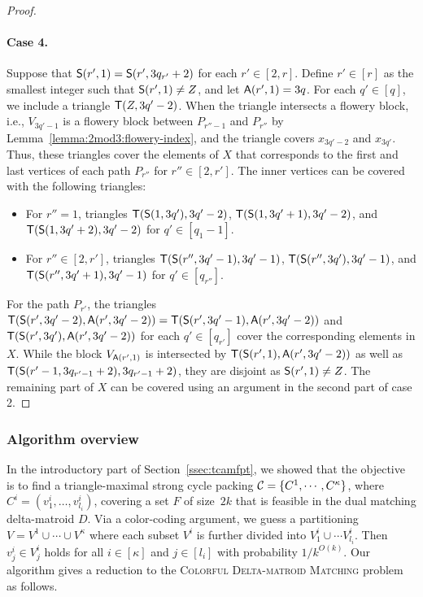 \begin{proof}
  \paragraph{Case 4.}
  Suppose that $\mathsf{S}(r', 1) = \mathsf{S}(r', 3q_{r'} + 2)$ for each $r' \in [2, r]$.
  Define $r' \in [r]$ as the smallest integer such that $\mathsf{S}(r', 1) \ne Z$, and let $\mathsf{A}(r', 1) = 3q$.
  For each $q' \in [q]$, we include a triangle $\mathsf{T}(Z, 3q'-2)$.
  When the triangle intersects a flowery block, i.e., $V_{3q'-1}$ is a flowery block between $P_{r''-1}$ and $P_{r''}$ by Lemma~\ref{lemma:2mod3:flowery-index}, and the triangle covers $x_{3q'-2}$ and $x_{3q'}$. 
  Thus, these triangles cover the elements of $X$ that corresponds to the first and last vertices of each path $P_{r''}$ for $r'' \in [2, r']$.
  The inner vertices can be covered with the following triangles:
  \begin{itemize}
    \item 
    For $r'' = 1$, triangles $\mathsf{T}(\mathsf{S}(1, 3q'), 3q'-2)$, $\mathsf{T}(\mathsf{S}(1, 3q'+1), 3q'-2)$, and $\mathsf{T}(\mathsf{S}(1, 3q'+2), 3q'-2)$ for $q' \in [q_{1}-1]$.
    \item
    For $r'' \in [2, r']$, triangles $\mathsf{T}(\mathsf{S}(r'', 3q'-1), 3q'-1)$, $\mathsf{T}(\mathsf{S}(r'', 3q'), 3q'-1)$, and $\mathsf{T}(\mathsf{S}(r'', 3q'+1), 3q'-1)$ for $q' \in [q_{r''}]$.
  \end{itemize}
  For the path $P_{r'}$, the triangles $\mathsf{T}(\mathsf{S}(r', 3q'-2), \mathsf{A}(r', 3q'-2)) = \mathsf{T}(\mathsf{S}(r', 3q'-1), \mathsf{A}(r', 3q'-2))$ and $\mathsf{T}(\mathsf{S}(r', 3q'), \mathsf{A}(r', 3q'-2))$ for each $q' \in [q_{r'}]$ cover the corresponding elements in $X$.
  While the block $V_{\mathsf{A}(r', 1)}$ is intersected by $\mathsf{T}(\mathsf{S}(r', 1), \mathsf{A}(r', 3q'-2))$ as well as $\mathsf{T}(\mathsf{S}(r'-1, 3q_{r'-1} + 2), 3q_{r'-1}+2)$, they are disjoint as $\mathsf{S}(r', 1) \ne Z$.
  The remaining part of $X$ can be covered using an argument in the second part of case 2.
\end{proof}

\subsubsection{Algorithm overview} \label{ssec:tcam:overview}

In the introductory part of Section~\ref{ssec:tcamfpt}, we showed that the objective is to find
a triangle-maximal strong cycle packing $\mathcal C = \{ C^1, \cdots, C^{\kappa} \}$, where $C^i = (v^i_{1}, \dots, v^i_{l_i})$, covering a set $F$ of size~$2k$ that is feasible in the dual matching delta-matroid $D$.
Via a color-coding argument, we guess a partitioning $V= V^1 \cup \cdots \cup V^{\kappa}$ where each subset $V^i$ is further divided into $V_{1}^i \cup \cdots V_{l_i}^i$.
Then $v_j^i \in V_{j}^i$ holds for all $i \in [\kappa]$ and $j \in [l_i]$ with probability $1/k^{O(k)}$.
Our algorithm gives a reduction to the \textsc{Colorful Delta-matroid Matching} problem as follows.

